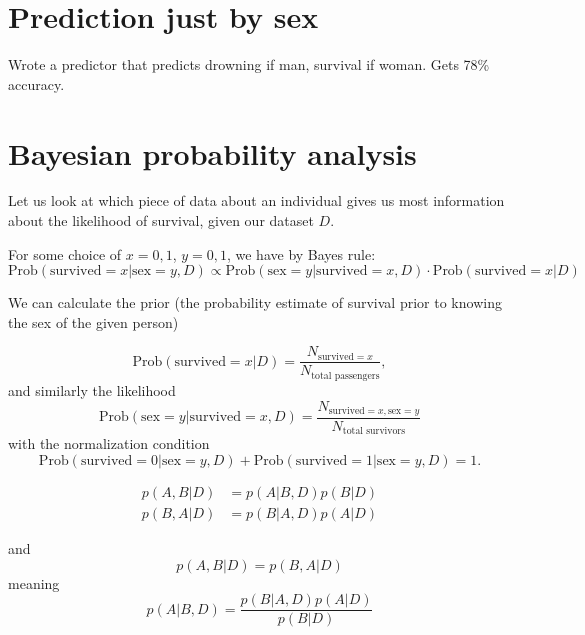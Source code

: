 \documentclass{book}
\begin{document}
\clearpage
\section*{Prediction just by sex}
Wrote a predictor that predicts drowning if man, survival if woman. 
Gets 78\% accuracy.

\section*{Bayesian probability analysis}
Let us look at which piece of data about an individual gives us most information 
about the likelihood of survival, given our dataset $D$.

For some choice of $x=0,1$, $y=0,1$, we have by Bayes rule:
\begin{equation}
    \text{Prob}(\text{survived}=x | \text{sex}=y, D) \propto \text{Prob}( \text{sex}=y|\text{survived}=x,D ) \cdot \text{Prob}(\text{survived}=x|D)
\end{equation}

We can calculate the prior (the probability estimate of survival prior to knowing the sex of the given person)

\begin{equation}
    \text{Prob}(\text{survived}=x|D) = \frac{N_{\text{survived}=x}}{N_\text{total passengers}},
\end{equation}
and similarly the likelihood
\begin{equation}
    \text{Prob}(\text{sex}=y|\text{survived}=x, D) = \frac{N_{\text{survived}=x, \text{sex}=y}}{N_\text{total survivors}}
\end{equation}
with the normalization condition 
\begin{equation}
    \text{Prob}(\text{survived}=0|\text{sex}=y, D) + \text{Prob}(\text{survived}=1|\text{sex}=y, D) = 1.
\end{equation}






\clearpage
\begin{equation}
    \begin{split}
        p(A,B|D) & = p(A|B,D)p(B|D) \\
        p(B,A|D) & = p(B|A,D)p(A|D)
    \end{split}
\end{equation}

and
\begin{equation}
    p(A,B|D) = p(B,A|D)
\end{equation}
meaning 
\begin{equation}
    p(A|B,D) =  \frac{p(B|A,D)p(A|D)}{p(B|D)}
\end{equation}
\end{document}
